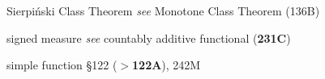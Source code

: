 






















































































Sierpi\'nski Class Theorem {\it see} Monotone Class Theorem (136B)



signed measure 
  {\it see} countably additive functional ({\bf 231C})











simple function \S122 ({\bf $\pmb{>}$122A}), 242M
  











